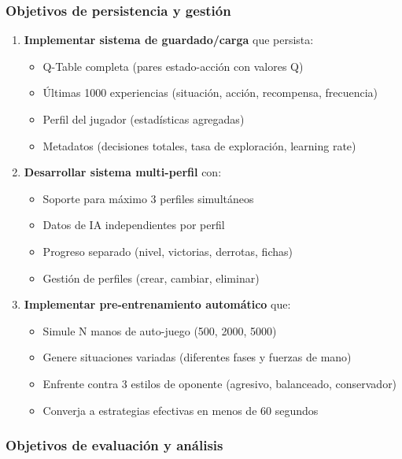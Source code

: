 \documentclass[12pt,a4paper]{article}
\begin{document}
\subsubsection{Objetivos de persistencia y gestión}

\begin{enumerate}
    \item \textbf{Implementar sistema de guardado/carga} que persista:
    \begin{itemize}
        \item Q-Table completa (pares estado-acción con valores Q)
        \item Últimas 1000 experiencias (situación, acción, recompensa, frecuencia)
        \item Perfil del jugador (estadísticas agregadas)
        \item Metadatos (decisiones totales, tasa de exploración, learning rate)
    \end{itemize}
    
    \item \textbf{Desarrollar sistema multi-perfil} con:
    \begin{itemize}
        \item Soporte para máximo 3 perfiles simultáneos
        \item Datos de IA independientes por perfil
        \item Progreso separado (nivel, victorias, derrotas, fichas)
        \item Gestión de perfiles (crear, cambiar, eliminar)
    \end{itemize}
    
    \item \textbf{Implementar pre-entrenamiento automático} que:
    \begin{itemize}
        \item Simule N manos de auto-juego (500, 2000, 5000)
        \item Genere situaciones variadas (diferentes fases y fuerzas de mano)
        \item Enfrente contra 3 estilos de oponente (agresivo, balanceado, conservador)
        \item Converja a estrategias efectivas en menos de 60 segundos
    \end{itemize}
\end{enumerate}

\subsubsection{Objetivos de evaluación y análisis}
\end{document}
